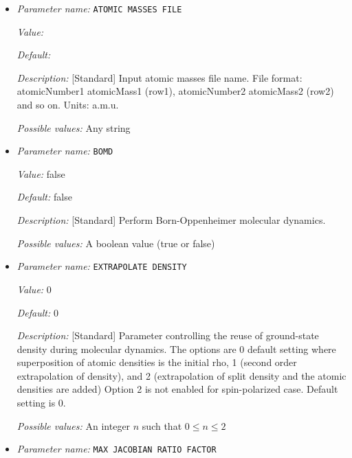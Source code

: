 \begin{itemize}
\item {\it Parameter name:} {\tt ATOMIC MASSES FILE}
\label{parameters:Molecular Dynamics/ATOMIC MASSES FILE}
\label{parameters:Molecular_20Dynamics/ATOMIC_20MASSES_20FILE}


{\it Value:} 


{\it Default:} 


{\it Description:} [Standard] Input atomic masses file name. File format: atomicNumber1 atomicMass1 (row1), atomicNumber2 atomicMass2 (row2) and so on. Units: a.m.u.


{\it Possible values:} Any string
\item {\it Parameter name:} {\tt BOMD}
\label{parameters:Molecular Dynamics/BOMD}
\label{parameters:Molecular_20Dynamics/BOMD}


{\it Value:} false


{\it Default:} false


{\it Description:} [Standard] Perform Born-Oppenheimer molecular dynamics.


{\it Possible values:} A boolean value (true or false)
\item {\it Parameter name:} {\tt EXTRAPOLATE DENSITY}
\label{parameters:Molecular Dynamics/EXTRAPOLATE DENSITY}
\label{parameters:Molecular_20Dynamics/EXTRAPOLATE_20DENSITY}


{\it Value:} 0


{\it Default:} 0


{\it Description:} [Standard] Parameter controlling the reuse of ground-state density during molecular dynamics. The options are 0 default setting where superposition of atomic densities is the initial rho, 1 (second order extrapolation of density), and 2 (extrapolation of split density and the atomic densities are added) Option 2 is not enabled for spin-polarized case. Default setting is 0.


{\it Possible values:} An integer $n$ such that $0\leq n \leq 2$
\item {\it Parameter name:} {\tt MAX JACOBIAN RATIO FACTOR}
\label{parameters:Molecular Dynamics/MAX JACOBIAN RATIO FACTOR}
\label{parameters:Molecular_20Dynamics/MAX_20JACOBIAN_20RATIO_20FACTOR}



\end{itemize}
